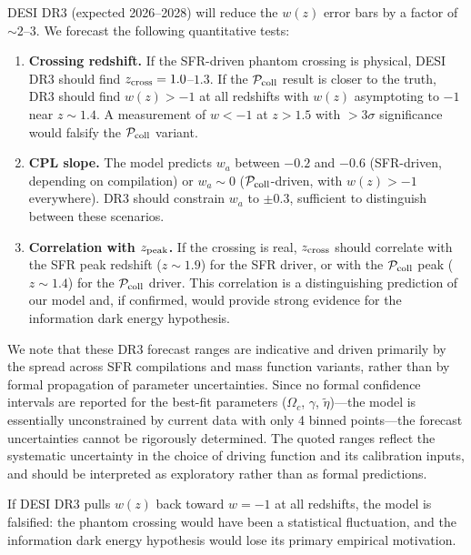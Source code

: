 \documentclass[aps,prd,twocolumn,superscriptaddress]{revtex4-2}
\begin{document}
DESI DR3 (expected 2026--2028) will reduce the $w(z)$ error bars by a factor of $\sim 2$--$3$. We forecast the following quantitative tests:

\begin{enumerate}
\item \textbf{Crossing redshift.} If the SFR-driven phantom crossing is physical, DESI DR3 should find $z_{\rm cross} = 1.0$--$1.3$. If the $\mathcal{P}_{\rm coll}$ result is closer to the truth, DR3 should find $w(z) > -1$ at all redshifts with $w(z)$ asymptoting to $-1$ near $z \sim 1.4$. A measurement of $w < -1$ at $z > 1.5$ with $>3\sigma$ significance would falsify the $\mathcal{P}_{\rm coll}$ variant.
\item \textbf{CPL slope.} The model predicts $w_a$ between $-0.2$ and $-0.6$ (SFR-driven, depending on compilation) or $w_a \sim 0$ ($\mathcal{P}_{\rm coll}$-driven, with $w(z) > -1$ everywhere). DR3 should constrain $w_a$ to $\pm 0.3$, sufficient to distinguish between these scenarios.
\item \textbf{Correlation with $z_{\rm peak}$.} If the crossing is real, $z_{\rm cross}$ should correlate with the SFR peak redshift ($z \sim 1.9$) for the SFR driver, or with the $\mathcal{P}_{\rm coll}$ peak ($z \sim 1.4$) for the $\mathcal{P}_{\rm coll}$ driver. This correlation is a distinguishing prediction of our model and, if confirmed, would provide strong evidence for the information dark energy hypothesis.
\end{enumerate}

We note that these DR3 forecast ranges are indicative and driven primarily by the spread across SFR compilations and mass function variants, rather than by formal propagation of parameter uncertainties. Since no formal confidence intervals are reported for the best-fit parameters ($\Omega_c$, $\gamma$, $\tilde{\eta}$)---the model is essentially unconstrained by current data with only 4 binned points---the forecast uncertainties cannot be rigorously determined. The quoted ranges reflect the systematic uncertainty in the choice of driving function and its calibration inputs, and should be interpreted as exploratory rather than as formal predictions.

If DESI DR3 pulls $w(z)$ back toward $w=-1$ at all redshifts, the model is falsified: the phantom crossing would have been a statistical fluctuation, and the information dark energy hypothesis would lose its primary empirical motivation.

\end{document}
